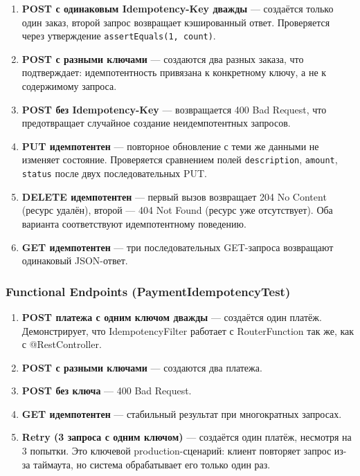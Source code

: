 \begin{enumerate}
    \item \textbf{POST с одинаковым Idempotency-Key дважды} --- создаётся только один заказ, второй запрос возвращает кэшированный ответ. Проверяется через утверждение \mbox{\texttt{assertEquals(1, count)}}.
    \item \textbf{POST с разными ключами} --- создаются два разных заказа, что подтверждает: идемпотентность привязана к конкретному ключу, а не к содержимому запроса.
    \item \textbf{POST без Idempotency-Key} --- возвращается 400 Bad Request, что предотвращает случайное создание неидемпотентных запросов.
    \item \textbf{PUT идемпотентен} --- повторное обновление с теми же данными не изменяет состояние. Проверяется сравнением полей \texttt{description}, \texttt{amount}, \texttt{status} после двух последовательных PUT.
    \item \textbf{DELETE идемпотентен} --- первый вызов возвращает 204 No Content (ресурс удалён), второй --- 404 Not Found (ресурс уже отсутствует). Оба варианта соответствуют идемпотентному поведению.
    \item \textbf{GET идемпотентен} --- три последовательных GET-запроса возвращают одинаковый JSON-ответ.
\end{enumerate}

\subsubsection{Functional Endpoints (PaymentIdempotencyTest)}

\begin{enumerate}
    \item \textbf{POST платежа с одним ключом дважды} --- создаётся один платёж. Демонстрирует, что IdempotencyFilter работает с RouterFunction так же, как с @RestController.
    \item \textbf{POST с разными ключами} --- создаются два платежа.
    \item \textbf{POST без ключа} --- 400 Bad Request.
    \item \textbf{GET идемпотентен} --- стабильный результат при многократных запросах.
    \item \textbf{Retry (3 запроса с одним ключом)} --- создаётся один платёж, несмотря на 3 попытки. Это ключевой production-сценарий: клиент повторяет запрос из-за таймаута, но система обрабатывает его только один раз.
\end{enumerate}

